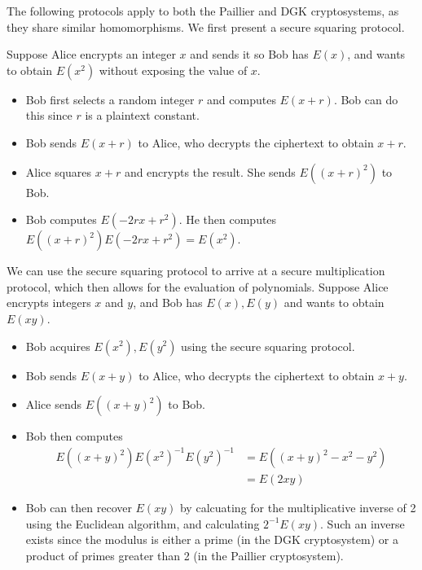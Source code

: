 The following protocols apply to both the Paillier and DGK cryptosystems, as they share similar homomorphisms. We first present a secure squaring protocol.

Suppose Alice encrypts an integer $x$ and sends it so Bob has $E(x)$, and wants to obtain $E(x^2)$ without exposing the value of $x$.
\begin{itemize}
	\item Bob first selects a random integer $r$ and computes $E(x+r)$. Bob can do this since $r$ is a plaintext constant.
	\item Bob sends $E(x+r)$ to Alice, who decrypts the ciphertext to obtain $x+r$.
	\item Alice squares $x+r$ and encrypts the result. She sends $E((x+r)^2)$ to Bob.
	\item Bob computes $E(-2rx + r^2)$. He then computes $E((x+r)^2)E(-2rx + r^2) = E(x^2)$.
\end{itemize}

We can use the secure squaring protocol to arrive at a secure multiplication protocol, which then allows for the evaluation of polynomials.
Suppose Alice encrypts integers $x$ and $y$, and Bob has $E(x), E(y)$ and wants to obtain $E(xy)$.
\begin{itemize}
	\item Bob acquires $E(x^2), E(y^2)$ using the secure squaring protocol.
	\item Bob sends $E(x+y)$ to Alice, who decrypts the ciphertext to obtain $x+y$.
	\item Alice sends $E((x+y)^2)$ to Bob.
	\item Bob then computes
	\begin{align*}
		E((x+y)^2)E(x^2)^{-1}E(y^2)^{-1} &= E((x+y)^2 - x^2 - y^2)\\
		&= E(2xy)
	\end{align*}
	\item Bob can then recover $E(xy)$ by calcuating for the multiplicative inverse of 2 using the Euclidean algorithm, and calculating $2^{-1}E(xy)$. Such an inverse exists since the modulus is either a prime (in the DGK cryptosystem) or a product of primes greater than 2 (in the Paillier cryptosystem).
\end{itemize}
